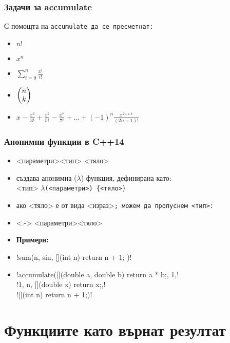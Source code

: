 \documentclass{beamer}
\begin{document}
\begin{frame}
  \frametitle{Задачи за accumulate}
  С помощта на \tt{accumulate} да се пресметнат:

  \begin{itemize}[<+->]
  \item $n!$
  \item $x^n$
  \item $\displaystyle\sum_{i=0}^n \frac{x^i}{i!}$
  \item $\displaystyle\left(\begin{array}{@{}c@{}}n\\k\end{array}\right)$
  \item $\displaystyle x - \frac{x^3}{3!} + \frac{x^5}{5!} - \frac{x^7}{7!} + \ldots + (-1)^n\frac{x^{2n+1}}{(2n+1)!}$
  \end{itemize}
\end{frame}

\begin{frame}[fragile]
  \frametitle{Анонимни функции в C++14}
  \begin{itemize}[<+->]
  \item \tta{[](}<параметри>\tta{) -> }<тип> \tta{\{}<тяло>\tta{\}}
  \item създава анонимна ($\lambda$) функция, дефинирана като:\\
    <тип> $\lambda$\tt(<параметри>\tt{) \{}<тяло>\tt\}
  \item ако <тяло> е от вида <израз>\tt; можем да пропуснем <тип>:
  \item<.-> \tta{[](}<параметри>\tta{) \{}<тяло>\tta{\}}
  \item \textbf{Примери:}
  \item \lst!sum(n, sin, [](int n) { return n + 1; })!
  \item \lst!accumulate([](double a, double b) { return a * b;}, 1,!\\
    \hspace{13ex}\lst!1, n, [](double x) {return x;},!\\
    \hspace{13ex}\lst![](int n) { return n + 1;})!
  \end{itemize}
\end{frame}

\section{Функциите като върнат резултат}
\end{document}
